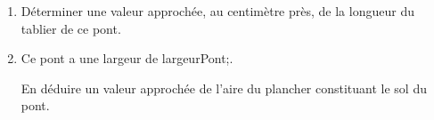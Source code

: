 \documentclass[exercice]{thedocument}%
\begin{document}
%
\begin{center}\footnotesize
\end{center}
\begin{enumerate}
    \item Déterminer une valeur approchée, au centimètre près,
    de la longueur du tablier de ce pont.
    \item Ce pont a une largeur de \<largeurPont;.\par
    En déduire un valeur approchée de l'aire du plancher constituant
    le sol du pont.
\end{enumerate}
\end{document}
